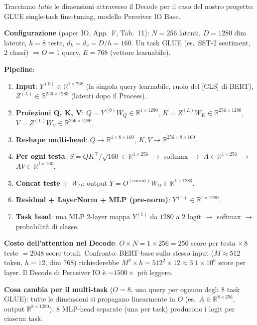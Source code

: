 \documentclass[
  11pt,
]{article}
\begin{document}
\begin{notabox}[title={\textbf{Esempio end-to-end: GLUE single-task fine-tuning (SST-2)}}]
Tracciamo \emph{tutte} le dimensioni attraverso il Decode per il caso del nostro progetto: GLUE single-task fine-tuning, modello Perceiver IO Base.

\textbf{Configurazione} (paper IO, App.~F, Tab.~11):
$N = 256$ latenti, $D = 1280$ dim latente, $h = 8$ teste, $d_k = d_v = D/h = 160$. Un task GLUE (es.\ SST-2 sentiment, 2 classi) $\Rightarrow O = 1$ query, $E = 768$ (vettore learnabile).

\textbf{Pipeline}:
\begin{enumerate}\setlength\itemsep{0.15em}
\item \textbf{Input}: $Y^{(0)} \in \mathbb{R}^{1 \times 768}$ (la singola query learnabile, ruolo del [CLS] di BERT), $Z^{(L)} \in \mathbb{R}^{256 \times 1280}$ (latenti dopo il Process).
\item \textbf{Proiezioni Q, K, V}: $Q = Y^{(0)} W_Q \in \mathbb{R}^{1 \times 1280}$, $K = Z^{(L)} W_K \in \mathbb{R}^{256 \times 1280}$, $V = Z^{(L)} W_V \in \mathbb{R}^{256 \times 1280}$.
\item \textbf{Reshape multi-head}: $Q \to \mathbb{R}^{1 \times 8 \times 160}$, $K, V \to \mathbb{R}^{256 \times 8 \times 160}$.
\item \textbf{Per ogni testa}: $S = QK^\top / \sqrt{160} \in \mathbb{R}^{1 \times 256}$ $\to$ softmax $\to$ $A \in \mathbb{R}^{1 \times 256}$ $\to$ $AV \in \mathbb{R}^{1 \times 160}$.
\item \textbf{Concat teste + $W_O$}: output $\widetilde Y = O^{(\text{concat})} W_O \in \mathbb{R}^{1 \times 1280}$.
\item \textbf{Residual + LayerNorm + MLP (pre-norm)}: $Y^{(1)} \in \mathbb{R}^{1 \times 1280}$.
\item \textbf{Task head}: una MLP 2-layer mappa $Y^{(1)}$ da $1280$ a $2$ logit $\to$ softmax $\to$ probabilità di classe.
\end{enumerate}

\textbf{Costo dell'attention nel Decode}: $O \times N = 1 \times 256 = 256$ score per testa $\times\, 8$ teste $= 2048$ score totali. Confronto: BERT-base sullo stesso input ($M \approx 512$ token, $h=12$, dim $768$) richiederebbe $M^2 \times h = 512^2 \times 12 \approx 3.1 \times 10^6$ score per layer. Il Decode di Perceiver IO è $\sim 1500\times$ più leggero.

\textbf{Cosa cambia per il multi-task} ($O = 8$, una query per ognuno degli 8 task GLUE): tutte le dimensioni si propagano linearmente in $O$ (es.\ $A \in \mathbb{R}^{8 \times 256}$, output $\mathbb{R}^{8 \times 1280}$); 8 MLP-head separate (una per task) producono i logit per ciascun task.
\end{notabox}
\end{document}
